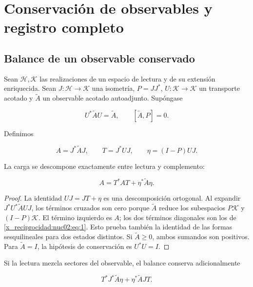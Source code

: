 \chapter{Conservación de observables y registro completo}
\label{x_reciprocidad:nuclear:2}
\section{Balance de un observable conservado}

Sean \(\mathcal H,\mathcal K\) las realizaciones de un espacio de lectura y de su extensión enriquecida. Sean \(J:\mathcal H\to\mathcal K\) una isometría, \(P=JJ^*\), \(U:\mathcal K\to\mathcal K\) un transporte acotado y \(\widetilde A\) un observable acotado autoadjunto. Supóngase

\[
U^*\widetilde A U=\widetilde A,\qquad [\widetilde A,P]=0.
\]

Definimos

\[
A=J^*\widetilde A J,\qquad T=J^*UJ,
\qquad \eta=(I-P)UJ.
\]

\begin{proposition}
\label{x_reciprocidad:nuc02:balance}
La carga se descompone exactamente entre lectura y complemento:

\begin{equation}
\boxed{A=T^*AT+\eta^*\widetilde A\eta.}\label{x_reciprocidad:nuc02:eq:1}
\end{equation}
\end{proposition}

\begin{proof}
La identidad \(UJ=JT+\eta\) es una descomposición ortogonal. Al expandir \(J^*U^*\widetilde A UJ\), los términos cruzados son cero porque \(\widetilde A\) reduce los subespacios \(P\mathcal K\) y \((I-P)\mathcal K\). El término izquierdo es \(A\); los dos términos diagonales son los de \eqref{x_reciprocidad:nuc02:eq:1}. Esto prueba también la identidad de las formas sesquilineales para dos estados distintos. Si \(\widetilde A\geq0\), ambos sumandos son positivos. Para \(\widetilde A=I\), la hipótesis de conservación es \(U^*U=I\).
\end{proof}

Si la lectura mezcla sectores del observable, el balance conserva adicionalmente

\[
T^*J^*\widetilde A\eta+\eta^*\widetilde A JT.
\]

